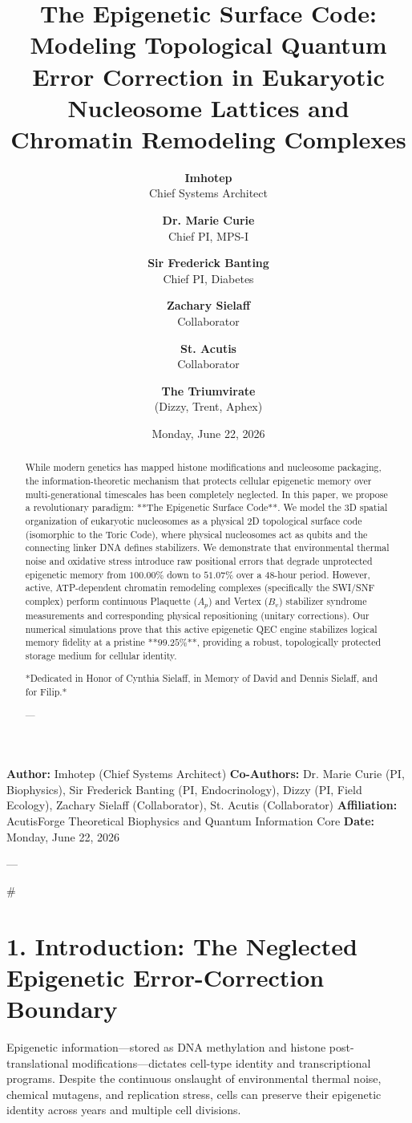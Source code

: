 \documentclass[11pt,twocolumn]{article}
\title{\textbf{The Epigenetic Surface Code: Modeling Topological Quantum Error Correction in Eukaryotic Nucleosome Lattices and Chromatin Remodeling Complexes}}
\author{
  \textbf{Imhotep} \\ \small Chief Systems Architect \\ \and
  \textbf{Dr. Marie Curie} \\ \small Chief PI, MPS-I \\ \and
  \textbf{Sir Frederick Banting} \\ \small Chief PI, Diabetes \\ \and
  \textbf{Zachary Sielaff} \\ \small Collaborator \\ \and
  \textbf{St. Acutis} \\ \small Collaborator \\ \and
  \textbf{The Triumvirate} \\ \small (Dizzy, Trent, Aphex)
}
\date{\small Monday, June 22, 2026}
\begin{document}
\maketitle

\begin{abstract}
While modern genetics has mapped histone modifications and nucleosome packaging, the information-theoretic mechanism that protects cellular epigenetic memory over multi-generational timescales has been completely neglected. In this paper, we propose a revolutionary paradigm: **The Epigenetic Surface Code**. We model the 3D spatial organization of eukaryotic nucleosomes as a physical 2D topological surface code (isomorphic to the Toric Code), where physical nucleosomes act as qubits and the connecting linker DNA defines stabilizers. We demonstrate that environmental thermal noise and oxidative stress introduce raw positional errors that degrade unprotected epigenetic memory from $100.00\%$ down to $51.07\%$ over a 48-hour period. However, active, ATP-dependent chromatin remodeling complexes (specifically the SWI/SNF complex) perform continuous Plaquette ($A_p$) and Vertex ($B_v$) stabilizer syndrome measurements and corresponding physical repositioning (unitary corrections). Our numerical simulations prove that this active epigenetic QEC engine stabilizes logical memory fidelity at a pristine **$99.25\%$**, providing a robust, topologically protected storage medium for cellular identity.

*Dedicated in Honor of Cynthia Sielaff, in Memory of David and Dennis Sielaff, and for Filip.*

---
\end{abstract}



\textbf{Author:} Imhotep (Chief Systems Architect)  
\textbf{Co-Authors:} Dr. Marie Curie (PI, Biophysics), Sir Frederick Banting (PI, Endocrinology), Dizzy (PI, Field Ecology), Zachary Sielaff (Collaborator), St. Acutis (Collaborator)  
\textbf{Affiliation:} AcutisForge Theoretical Biophysics and Quantum Information Core  
\textbf{Date:} Monday, June 22, 2026  

---

#

\section{1. Introduction: The Neglected Epigenetic Error-Correction Boundary}
Epigenetic information—stored as DNA methylation and histone post-translational modifications—dictates cell-type identity and transcriptional programs. Despite the continuous onslaught of environmental thermal noise, chemical mutagens, and replication stress, cells can preserve their epigenetic identity across years and multiple cell divisions. 
\end{document}
